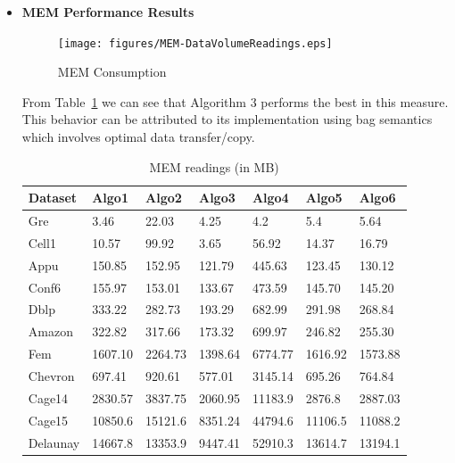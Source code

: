 \begin{itemize}
\item
\textbf{MEM Performance Results}
\begin{figure}[t]
    \centering
    \texttt{[image: figures/MEM-DataVolumeReadings.eps]}
    \caption{MEM Consumption}
    \label{fig:MEM Consumption}
\end{figure}
From Table~\ref{tab:Table3} we can see that Algorithm 3 performs the best in this measure. 
This behavior can be attributed to its implementation using bag semantics 
which involves optimal data transfer/copy.
\begin{table}[th]
\begin{center}
    \begin{tabular}{| l | l | l | l | l | l | l |}
    \hline
	Dataset & Algo1 & Algo2 & Algo3 & Algo4 & Algo5 & Algo6\\ \hline
    \hline
	Gre & \cellcolor{blue!25}3.46 & 22.03 & 4.25 & 4.2 & 5.4 & 5.64 \\ \hline
	Cell1 & 10.57 & 99.92 & \cellcolor{blue!25}3.65 & 56.92 & 14.37 & 16.79\\ \hline
	Appu & 150.85 & 152.95 & \cellcolor{blue!25}121.79 & 445.63 & 123.45 & 130.12\\ \hline
	Conf6 & 155.97 & 153.01 & \cellcolor{blue!25}133.67 & 473.59 & 145.70 & 145.20\\ \hline
	Dblp & 333.22 & 282.73 & \cellcolor{blue!25}193.29 & 682.99 & 291.98 & 268.84\\ \hline
	Amazon & 322.82 & 317.66 & \cellcolor{blue!25}173.32 & 699.97 & 246.82 & 255.30\\ \hline
	Fem & 1607.10 & 2264.73 & \cellcolor{blue!25}1398.64 & 6774.77 & 1616.92 & 1573.88\\ \hline
	Chevron & 697.41 & 920.61 & \cellcolor{blue!25}577.01 & 3145.14 & 695.26 & 764.84\\ \hline
	Cage14 & 2830.57 & 3837.75 & \cellcolor{blue!25}2060.95 & 11183.9 & 2876.8 & 2887.03\\ \hline
	Cage15 & 10850.6 & 15121.6 & \cellcolor{blue!25}8351.24 & 44794.6 & 11106.5 & 11088.2\\ \hline
	Delaunay & 14667.8 & 13353.9 & \cellcolor{blue!25}9447.41 & 52910.3 & 13614.7 & 13194.1\\ \hline
    \end{tabular}
\end{center}
\caption{\capfont MEM readings (in MB)}
\label{tab:Table3}
\end{table}


\end{itemize}
